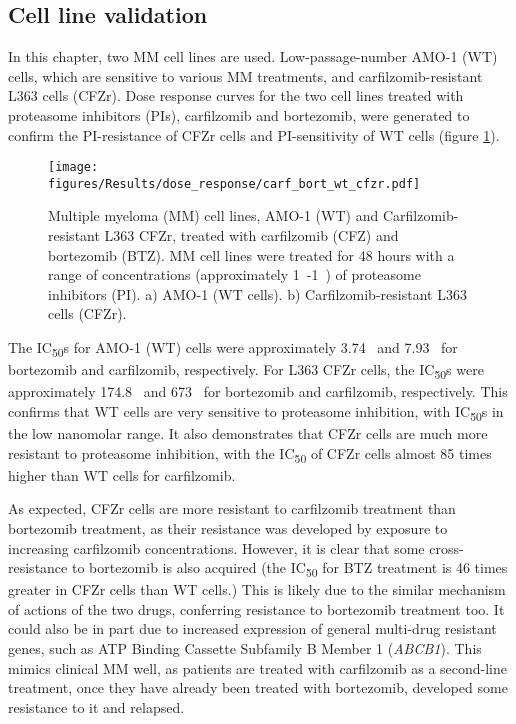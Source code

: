 \subsection{Cell line validation}
In this chapter, two MM cell lines are used.
Low-passage-number AMO-1 (WT) cells, which are sensitive to various MM treatments, and carfilzomib-resistant L363 cells (CFZr).
Dose response curves for the two cell lines treated with proteasome inhibitors (PIs), carfilzomib and bortezomib, were generated to confirm the PI-resistance of CFZr cells and PI-sensitivity of WT cells (figure \ref{fig:dose_carf_bort}).
\begin{figure}[h]
\centering
\texttt{[image: figures/Results/dose\_response/carf\_bort\_wt\_cfzr.pdf]}
\caption[Carfilzomib and bortezomib dose response curves]{Multiple myeloma (MM) cell lines, AMO-1 (WT) and Carfilzomib-resistant L363 CFZr, treated with carfilzomib (CFZ) and bortezomib (BTZ).
MM cell lines were treated for 48 hours with a range of concentrations (approximately 1\si{\nano\Molar}-1\si{\micro\Molar}) of proteasome inhibitors (PI).
a) AMO-1 (WT cells).
b) Carfilzomib-resistant L363 cells (CFZr).}
\label{fig:dose_carf_bort}
\end{figure}
The IC\textsubscript{50}s for AMO-1 (WT) cells were approximately 3.74\si{\nano\Molar} and 7.93\si{\nano\Molar} for bortezomib and carfilzomib, respectively.
For L363 CFZr cells, the IC\textsubscript{50}s were approximately 174.8\si{\nano\Molar} and 673\si{\nano\Molar} for bortezomib and carfilzomib, respectively.
This confirms that WT cells are very sensitive to proteasome inhibition, with IC\textsubscript{50}s in the low nanomolar range.
It also demonstrates that CFZr cells are much more resistant to proteasome inhibition, with the IC\textsubscript{50} of CFZr cells almost 85 times higher than WT cells for carfilzomib.

As expected, CFZr cells are more resistant to carfilzomib treatment than bortezomib treatment, as their resistance was developed by exposure to increasing carfilzomib concentrations.
However, it is clear that some cross-resistance to bortezomib is also acquired (the IC\textsubscript{50} for BTZ treatment is 46 times greater in CFZr cells than WT cells.)
This is likely due to the similar mechanism of actions of the two drugs, conferring resistance to bortezomib treatment too.
It could also be in part due to increased expression of general multi-drug resistant genes, such as ATP Binding Cassette Subfamily B Member 1 (\textit{ABCB1}).
This mimics clinical MM well, as patients are treated with carfilzomib as a second-line treatment, once they have already been treated with bortezomib, developed some resistance to it and relapsed.

